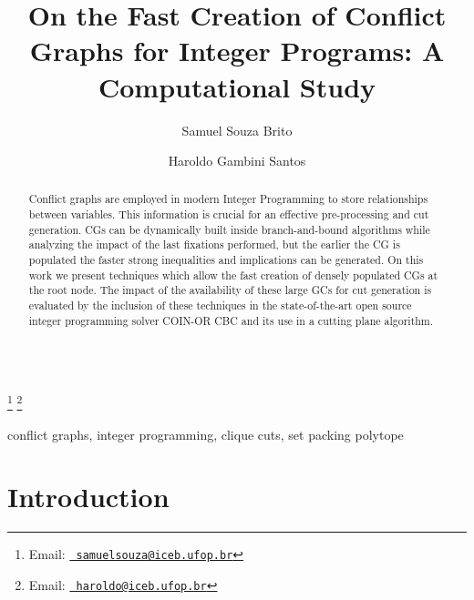 \documentclass{endm}
\begin{document}
  

\begin{verbatim}\end{verbatim}\vspace{2.5cm}

\begin{frontmatter}

\title{On the Fast Creation of Conflict Graphs for Integer Programs: A Computational Study}

\author{Samuel Souza Brito \and Haroldo Gambini Santos}
 
\address{Computing Department\\ Universidade Federal de Ouro Preto - UFOP\\ Ouro Preto, Brazil}
\thanks[myemail]{Email:
   \href{mailto:samuelsouza@iceb.ufop.br} {\texttt{\normalshape
   samuelsouza@iceb.ufop.br}}} \thanks[coemail]{Email:
   \href{mailto:haroldo@iceb.ufop.br} {\texttt{\normalshape
   haroldo@iceb.ufop.br}}}

\begin{abstract}
Conflict graphs are employed in modern Integer Programming to store relationships between variables. This information is crucial for an effective pre-processing and cut generation. CGs can be dynamically built inside branch-and-bound algorithms while analyzing the impact of the last fixations performed, but the earlier the CG is populated the faster strong inequalities and implications can be generated. On this work we present techniques which allow the fast creation of densely populated CGs at the root node. The impact of the availability of these large GCs for cut generation is evaluated by the inclusion of these techniques in the state-of-the-art open source integer programming solver COIN-OR CBC and its use in a cutting plane algorithm.
\end{abstract}

\begin{keyword}
conflict graphs, integer programming, clique cuts, set packing polytope
\end{keyword}

\end{frontmatter}


\section{Introduction}\label{intro}
\end{document}
